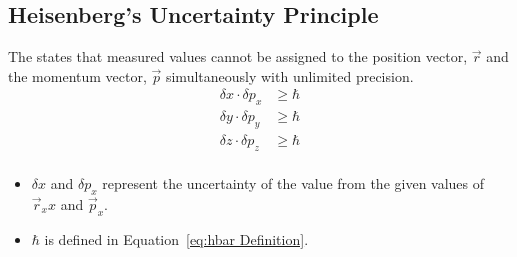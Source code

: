 	\subsection{Heisenberg's Uncertainty Principle} \label{subsec:Heisenberg's Uncertainty Principle}
		\begin{definition} \label{def:Heisenberg's Uncertainty Principle}
			The  states that measured values cannot be assigned to the position vector, $\vec{r}$ and the momentum vector, $\vec{p}$ simultaneously with unlimited precision.
			\begin{equation} \label{eq:Heisenberg's Uncertainty Principle}
				\begin{aligned}
					\delta x \cdot \delta p_{x} &\geq \hbar \\
					\delta y \cdot \delta p_{y} &\geq \hbar \\
					\delta z \cdot \delta p_{z} &\geq \hbar \\
				\end{aligned}
			\end{equation}
			\begin{itemize}[noitemsep, nolistsep]
				\item $\delta x$ and $\delta p_{x}$ represent the uncertainty of the value from the given values of $\vec{r}_{x}x$ and $\vec{p}_{x}$.
				\item $\hbar$ is defined in Equation~\eqref{eq:hbar Definition}.
			\end{itemize}
		\end{definition}